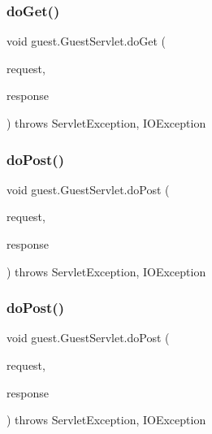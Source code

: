 \mbox{\label{classguest_1_1_guest_servlet_af359e1e70b3678884a8300e284490041}} 
\subsubsection{\texorpdfstring{doGet()}{doGet()}\hspace{0.1cm}{\footnotesize\ttfamily [2/2]}}
{\footnotesize\ttfamily void guest.\+Guest\+Servlet.\+do\+Get (\begin{DoxyParamCaption}\item[{Http\+Servlet\+Request}]{request,  }\item[{Http\+Servlet\+Response}]{response }\end{DoxyParamCaption}) throws Servlet\+Exception, I\+O\+Exception\hspace{0.3cm}{\ttfamily [protected]}}

\mbox{\label{classguest_1_1_guest_servlet_abd464d13df4606723ffedb2685269f01}} 
\subsubsection{\texorpdfstring{doPost()}{doPost()}\hspace{0.1cm}{\footnotesize\ttfamily [1/2]}}
{\footnotesize\ttfamily void guest.\+Guest\+Servlet.\+do\+Post (\begin{DoxyParamCaption}\item[{Http\+Servlet\+Request}]{request,  }\item[{Http\+Servlet\+Response}]{response }\end{DoxyParamCaption}) throws Servlet\+Exception, I\+O\+Exception\hspace{0.3cm}{\ttfamily [protected]}}

\mbox{\label{classguest_1_1_guest_servlet_abd464d13df4606723ffedb2685269f01}} 
\subsubsection{\texorpdfstring{doPost()}{doPost()}\hspace{0.1cm}{\footnotesize\ttfamily [2/2]}}
{\footnotesize\ttfamily void guest.\+Guest\+Servlet.\+do\+Post (\begin{DoxyParamCaption}\item[{Http\+Servlet\+Request}]{request,  }\item[{Http\+Servlet\+Response}]{response }\end{DoxyParamCaption}) throws Servlet\+Exception, I\+O\+Exception\hspace{0.3cm}{\ttfamily [protected]}}




